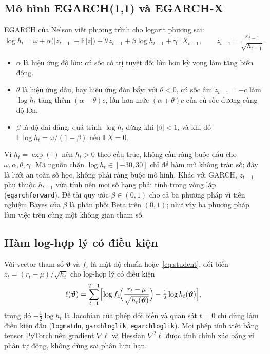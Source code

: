 \documentclass[11pt,a4paper]{article}
\renewcommand{\_}{\gachduoi\allowbreak}
\newcommand{\ham}[1]{\texttt{#1}}
\newcommand{\E}{\mathbb{E}}
\newcommand{\bgamma}{\boldsymbol\gamma}
\newcommand{\btheta}{\boldsymbol\vartheta}
\begin{document}
\subsection{Mô hình EGARCH(1,1) và EGARCH-X}
EGARCH của Nelson \cite{nelson1991} viết phương trình cho logarit phương sai:
\begin{equation}\label{eq:egarch}
\log h_t=\omega+\alpha\bigl(|z_{t-1}|-\E|z|\bigr)+\theta\,z_{t-1}+\beta\log h_{t-1}+\bgamma^{\!\top}X_{t-1},\qquad z_{t-1}=\frac{\varepsilon_{t-1}}{\sqrt{h_{t-1}}} .
\end{equation}
\begin{itemize}
\item $\alpha$ là hiệu ứng độ lớn: cú sốc có trị tuyệt đối lớn hơn kỳ vọng làm tăng biến động.
\item $\theta$ là hiệu ứng dấu, hay hiệu ứng đòn bẩy: với $\theta<0$, cú sốc âm $z_{t-1}=-c$ làm $\log h_t$ tăng thêm $(\alpha-\theta)c$, lớn hơn mức $(\alpha+\theta)c$ của cú sốc dương cùng độ lớn.
\item $\beta$ là độ dai dẳng; quá trình $\log h_t$ dừng khi $|\beta|<1$, và khi đó $\E\log h_t=\omega/(1-\beta)$ nếu $\E X=0$.
\end{itemize}
Vì $h_t=\exp(\cdot)$ nên $h_t>0$ theo cấu trúc, không cần ràng buộc dấu cho $\omega,\alpha,\theta,\bgamma$. Mã nguồn chặn $\log h_t\in[-30,30]$ chỉ để hàm mũ không tràn số; đây là lưới an toàn số học, không phải ràng buộc mô hình. Khác với GARCH, $z_{t-1}$ phụ thuộc $h_{t-1}$ vừa tính nên mọi số hạng phải tính trong vòng lặp (\ham{egarch\_forward}). Đề tài quy ước $\beta\in(0,1)$ cho cả ba phương pháp vì tiên nghiệm Bayes của $\beta$ là phân phối Beta trên $(0,1)$; như vậy ba phương pháp làm việc trên cùng một không gian tham số.

\subsection{Hàm log-hợp lý có điều kiện}
Với vector tham số $\btheta$ và $f_z$ là mật độ chuẩn hoặc~\eqref{eq:student}, đổi biến $z_t=(r_t-\mu)/\sqrt{h_t}$ cho log-hợp lý có điều kiện
\begin{equation}\label{eq:loglik}
\ell(\btheta)=\sum_{t=1}^{T-1}\Bigl[\log f_z\!\Bigl(\frac{r_t-\mu}{\sqrt{h_t(\btheta)}}\Bigr)-\tfrac12\log h_t(\btheta)\Bigr],
\end{equation}
trong đó $-\frac12\log h_t$ là Jacobian của phép đổi biến và quan sát $t=0$ chỉ dùng làm điều kiện đầu (\ham{log\_mat\_do}, \ham{garch\_loglik}, \ham{egarch\_loglik}). Mọi phép tính viết bằng tensor PyTorch nên gradient $\nabla\ell$ và Hessian $\nabla^2\ell$ được tính chính xác bằng vi phân tự động, không dùng sai phân hữu hạn.
\end{document}
